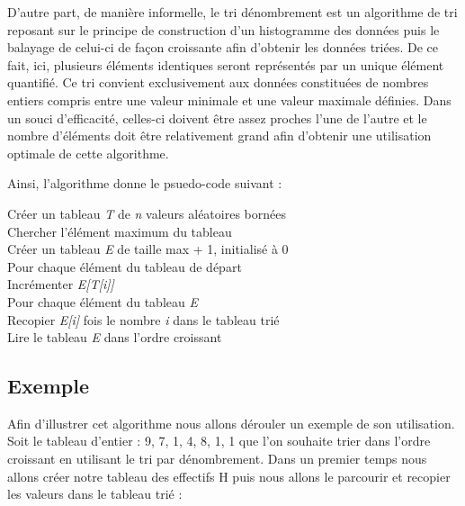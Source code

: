 \documentclass[12pt]{article}
\begin{document}
\hspace{1.0 cm} D'autre part, de manière informelle, le tri dénombrement est un algorithme de tri reposant sur le principe de construction d'un histogramme des données puis le balayage de celui-ci de façon croissante afin d'obtenir les données triées.
De ce fait, ici, plusieurs éléments identiques seront représentés par un unique élément quantifié. Ce tri convient exclusivement aux données constituées de nombres entiers compris entre une valeur minimale et une valeur maximale définies. Dans un souci d'efficacité, celles-ci doivent être assez proches l'une de l'autre et le nombre d'éléments doit être relativement grand afin d'obtenir une utilisation optimale de cette algorithme.

Ainsi, l'algorithme donne le psuedo-code suivant : \\

\begin{tcolorbox}
Créer un tableau \textit{T} de \textit{n} valeurs aléatoires bornées\\
Chercher l'élément maximum du tableau \\
 Créer un tableau \textit{E} de taille max + 1, initialisé à 0\\

Pour chaque élément du tableau de départ\\
\hspace*{1.0 cm} Incrémenter \textit{E[T[i]] }\\

Pour chaque élément du tableau \textit{E}\\
\hspace*{1.0 cm}   Recopier \textit{E[i]} fois le nombre \textit{i} dans le tableau trié\\
Lire le tableau \textit{E} dans l'ordre croissant
\end{tcolorbox}



\newpage
\subsection{Exemple}
\hspace{1.0 cm} Afin d'illustrer cet algorithme nous allons dérouler un exemple de son utilisation.
Soit le tableau d’entier : 9, 7, 1, 4, 8, 1, 1 que l’on souhaite trier dans l’ordre croissant en utilisant le tri par dénombrement.
Dans un premier temps nous allons créer notre tableau des effectifs H puis nous allons le parcourir et recopier les valeurs dans le tableau trié :
\end{document}
